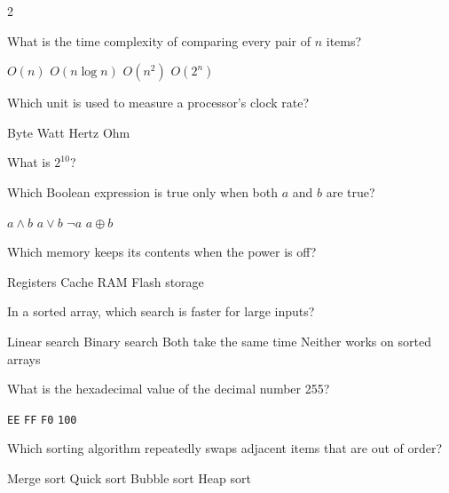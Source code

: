 \documentclass{exam}
\begin{document}
\begin{multicols}{2}
\begin{questions}
\question
What is the time complexity of comparing every pair of $n$ items?
\begin{choices}
    \choice $O(n)$
    \choice $O(n \log n)$
    \correctchoice $O(n^2)$
    \choice $O(2^n)$
\end{choices}

\question
Which unit is used to measure a processor's clock rate?
\begin{choices}
    \choice Byte
    \choice Watt
    \correctchoice Hertz
    \choice Ohm
\end{choices}

\question
What is $2^{10}$?
\begin{choices}
\end{choices}

\question
Which Boolean expression is true only when both $a$ and $b$ are true?
\begin{choices}
    \correctchoice $a \land b$
    \choice $a \lor b$
    \choice $\lnot a$
    \choice $a \oplus b$
\end{choices}

\question
Which memory keeps its contents when the power is off?
\begin{choices}
    \choice Registers
    \choice Cache
    \choice RAM
    \correctchoice Flash storage
\end{choices}

\question
In a sorted array, which search is faster for large inputs?
\begin{choices}
    \choice Linear search
    \correctchoice Binary search
    \choice Both take the same time
    \choice Neither works on sorted arrays
\end{choices}


\question
What is the hexadecimal value of the decimal number 255?
\begin{choices}
    \choice \texttt{EE}
    \correctchoice \texttt{FF}
    \choice \texttt{F0}
    \choice \texttt{100}
\end{choices}

\question
Which sorting algorithm repeatedly swaps adjacent items that are out of order?
\begin{choices}
    \choice Merge sort
    \choice Quick sort
    \correctchoice Bubble sort
    \choice Heap sort
\end{choices}


\end{questions}
\end{multicols}
\end{document}
